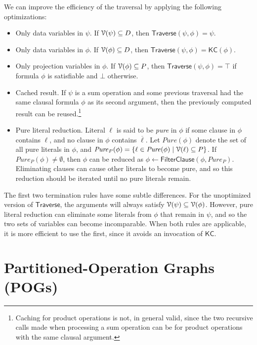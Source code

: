 \documentclass[letterpaper,USenglish,cleveref, autoref, thm-restate]{lipics-v2021}
\newcommand{\tautology}{\top}
\newcommand{\nil}{\bot}
\newcommand{\obar}[1]{\overline{#1}}
\newcommand{\lit}{\ell}
\newcommand{\dvarset}{D}
\newcommand{\pvarset}{P}
\newcommand{\dependencyset}{{\cal V}}
\newcommand{\pure}{\mathit{Pure}}
\newcommand{\algo}[1]{\textsf{#1}}
\newcommand{\kc}{\algo{KC}}
\newcommand{\traverse}{\algo{Traverse}}
\newcommand{\cfilter}{\algo{FilterClause}}
\begin{document}
We can improve the efficiency of the traversal by applying the following optimizations:
\begin{itemize}
\item Only data variables in $\psi$.  If $\dependencyset(\psi) \subseteq \dvarset$, then $\traverse(\psi, \phi) = \psi$.
\item Only data variables in $\phi$.  If $\dependencyset(\phi) \subseteq \dvarset$, then $\traverse(\psi, \phi) = \kc(\phi)$.
\item Only projection variables in $\phi$.  If $\dependencyset(\phi) \subseteq \pvarset$, then $\traverse(\psi, \phi) = \tautology$ if formula $\phi$ is satisfiable and $\nil$ otherwise.
\item Cached result. If $\psi$ is a sum operation and some previous traversal had the same clausal formula $\phi$ as its second argument, then the previously computed result can be reused.\footnote{
Caching for product operations is not, in general valid, since the two recursive calls made when processing a sum operation can be for product operations with the same clausal argument.}
\item Pure literal reduction.
Literal $\lit$ is said to be \emph{pure} in $\phi$ if some clause in $\phi$ contains $\lit$, and no clause in $\phi$ contains  $\obar{\lit}$.
Let $\pure(\phi)$ denote the set of all pure literals in $\phi$, and $\pure_{\pvarset}(\phi) = \{ \lit \in \pure(\phi) \mid  \dependencyset(\lit) \subseteq \pvarset \}$.
If $\pure_{\pvarset}(\phi) \not = \emptyset$, then $\phi$ can be reduced as
 $\phi \leftarrow \cfilter(\phi, \pure_{\pvarset})$.  Eliminating clauses can cause other literals to become pure, and so this reduction should be iterated until no pure literals remain.
\end{itemize}

The first two termination rules have some subtle differences.  For the
unoptimized version of $\traverse$, the arguments will always satisfy
$\dependencyset(\psi) \subseteq \dependencyset(\phi)$.  However, 
pure literal reduction can eliminate some literals from $\phi$
that remain in $\psi$, and so the two sets of variables can become
incomparable.  When both rules are applicable, it is more efficient to use the first, since it avoids an invocation of $\kc$.

\section{Partitioned-Operation Graphs (POGs)}
\end{document}
